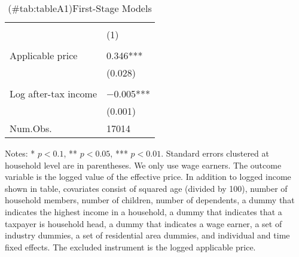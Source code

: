 \begin{table}

\caption{(\#tab:tableA1)First-Stage Models\label{tab:main-stage1}}
\centering
\fontsize{8}{10}\selectfont
\begin{threeparttable}
\begin{tabular}[t]{l>{\centering\arraybackslash}p{18.75em}}
\toprule
\multicolumn{1}{c}{ } & \multicolumn{1}{c}{Effective price} \\
\cmidrule(l{3pt}r{3pt}){2-2}
  & (1)\\
\midrule
\addlinespace[0.3em]
\multicolumn{2}{l}{\textit{Excluded instruments}}\\
\hspace{1em}Applicable price & \num{0.346}***\\
\hspace{1em} & (\num{0.028})\\
\addlinespace[0.3em]
\multicolumn{2}{l}{\textit{Covariates}}\\
\hspace{1em}Log after-tax income & \num{-0.005}***\\
\hspace{1em} & (\num{0.001})\\
\midrule
Num.Obs. & \num{17014}\\
\bottomrule
\end{tabular}
\begin{tablenotes}
\item Notes: * $p < 0.1$, ** $p < 0.05$, *** $p < 0.01$. Standard errors clustered at household level are in parentheses. We only use wage earners. The outcome variable is the logged value of the effective price. In addition to logged income shown in table, covariates consist of squared age (divided by 100), number of household members, number of children, number of dependents, a dummy that indicates the highest income in a household, a dummy that indicates that a taxpayer is household head, a dummy that indicates a wage earner, a set of industry dummies, a set of residential area dummies, and individual and time fixed effects. The excluded instrument is the logged applicable price.
\end{tablenotes}
\end{threeparttable}
\end{table}
